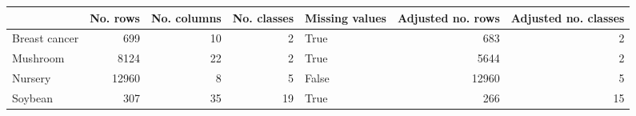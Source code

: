 \begin{tabular}{lrrrlrr}
\toprule
{} &  No. rows &  No. columns &  No. classes &  Missing values &  Adjusted no. rows &  Adjusted no. classes \\
\midrule
Breast cancer &       699 &           10 &            2 &            True &                683 &                     2 \\
Mushroom      &      8124 &           22 &            2 &            True &               5644 &                     2 \\
Nursery       &     12960 &            8 &            5 &           False &              12960 &                     5 \\
Soybean       &       307 &           35 &           19 &            True &                266 &                    15 \\
\bottomrule
\end{tabular}
